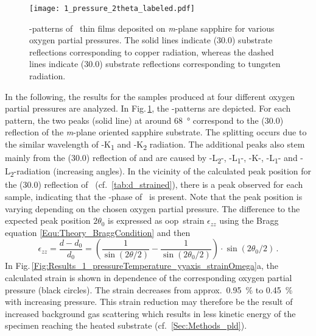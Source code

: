 \begin{figure}
    \centering
    \texttt{[image: 1\_pressure\_2theta\_labeled.pdf]}
    \caption{\thetaomega-patterns of \cro\ thin films deposited on \textit{m}-plane sapphire for various oxygen partial pressures.
    The solid lines indicate (30.0) substrate reflections corresponding to copper radiation, whereas the dashed lines indicate (30.0) substrate reflections corresponding to tungsten radiation.}
    \label{Fig:Results_1_pressure_2theta}
\end{figure}
In the following, the results for the samples produced at four different oxygen partial pressures are analyzed.
In Fig.\,\ref{Fig:Results_1_pressure_2theta}, the \thetaomega-patterns are depicted.
For each pattern, the two peaks (solid line) at around \qty{68}{\degree} correspond to the (30.0) reflection of the \textit{m}-plane oriented sapphire substrate.
The splitting occurs due to the similar wavelength of -K\textalpha\textsubscript{1} and -K\textalpha\textsubscript{2} radiation.
The additional peaks also stem mainly from the (30.0) reflection of  and are caused by
-L\textbeta\textsubscript{2}-,
-L\textbeta\textsubscript{1}-,
-K\textbeta-,
-L\textalpha\textsubscript{1}- and
-L\textalpha\textsubscript{2}-radiation (increasing angles).
In the vicinity of the calculated peak position for the (30.0) reflection of \cro\ (cf.~\ref{tab:d_strained}), there is a peak observed for each sample, indicating that the \textalpha-phase of \cro\ is present.
Note that the peak position is varying depending on the chosen oxygen partial pressure.
The difference to the expected peak position $2\theta_0$ is expressed as \gls{oop}\ strain $\epsilon_{zz}$ using the Bragg equation \eqref{Equ:Theory_BraggCondition} and then
\begin{equation}
    \label{Equ:Results_oop_strain_def}
    \epsilon_{zz}
    =\frac{d-d_0}{d_0}
    =\left(\frac{1}{\sin(2\theta/2)}-\frac{1}{\sin(2\theta_0/2)}\right)
    \cdot\sin(2\theta_0/2)\,.
\end{equation}
In Fig.\,\ref{Fig:Results_1_pressureTemperature_yyaxis_strainOmega}a, the calculated strain is shown in dependence of the corresponding oxygen partial pressure (black circles).
The strain decreases from approx.\ \qty{0.95}{\percent} to \qty{0.45}{\percent} with increasing pressure.
This strain reduction may therefore be the result of increased background gas scattering which results in less kinetic energy of the specimen reaching the heated substrate (cf.~\ref{Sec:Methods_pld}).
